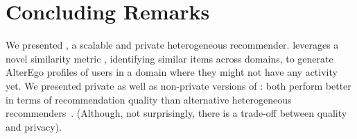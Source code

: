 \vspace{-3mm}
\section{Concluding Remarks}
\label{Conclusion}
We presented \crossrec, a scalable and private heterogeneous recommender. 
\crossrec leverages a novel similarity metric \graphsim, identifying similar items across domains, to generate AlterEgo profiles of users in a domain where they might not have any activity yet. We presented private as well as non-private versions of \crossrec: both perform better in terms of recommendation quality than alternative heterogeneous recommenders~\cite{baltrunas2009context,lemire2005slope,berkovsky2007cross,sarwar2001item, cremonesi2011cross}. (Although, not surprisingly, there is a trade-off between quality and privacy). 

